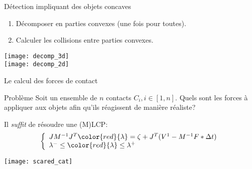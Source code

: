 \begin{frame}{Détection impliquant des objets concaves}
    \pause
    \begin{enumerate}
        \item Décomposer en parties convexes (une fois pour toutes).
        \item Calculer les collisions entre parties convexes.
    \end{enumerate}
    \begin{center}
        \texttt{[image: decomp\_3d]}\\
        \texttt{[image: decomp\_2d]}
    \end{center}
\end{frame}

\begin{frame}{Le calcul des forces de contact}
    \begin{block}{Problème}
         Soit un ensemble de $n$ contacts $C_i, i \in [1, n]$. Quels sont les
         forces à appliquer aux objets afin qu’ils réagissent de manière
         réaliste?
    \end{block}
    \pause
    Il \textit{suffit} de résoudre une (M)LCP:
    \[
    \left\{
        \begin{array}{l}
            JM^{-1}J^T {\color{red}{\lambda}} = \zeta +
            J^T(V^1 - M^{-1}F * \Delta t)\\
            \lambda^- \leq {\color{red}{\lambda}} \leq \lambda^+ %
        \end{array}
    \right.
    \]
    \begin{center}
        \texttt{[image: scared\_cat]}
    \end{center}
\end{frame}

